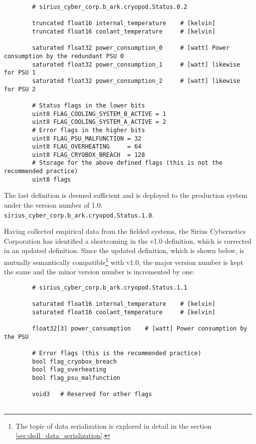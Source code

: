 \begin{remark}[breakable]
    \begin{verbatim}
        # sirius_cyber_corp.b_ark.cryopod.Status.0.2

        truncated float16 internal_temperature    # [kelvin]
        truncated float16 coolant_temperature     # [kelvin]

        saturated float32 power_consumption_0     # [watt] Power consumption by the redundant PSU 0
        saturated float32 power_consumption_1     # [watt] likewise for PSU 1
        saturated float32 power_consumption_2     # [watt] likewise for PSU 2

        # Status flags in the lower bits
        uint8 FLAG_COOLING_SYSTEM_B_ACTIVE = 1
        uint8 FLAG_COOLING_SYSTEM_A_ACTIVE = 2
        # Error flags in the higher bits
        uint8 FLAG_PSU_MALFUNCTION = 32
        uint8 FLAG_OVERHEATING     = 64
        uint8 FLAG_CRYOBOX_BREACH  = 128
        # Storage for the above defined flags (this is not the recommended practice)
        uint8 flags
    \end{verbatim}

    The last definition is deemed sufficient and is deployed to the production system
    under the version number of 1.0: \verb|sirius_cyber_corp.b_ark.cryopod.Status.1.0|.

    Having collected empirical data from the fielded systems, the Sirius Cybernetics Corporation has
    identified a shortcoming in the v1.0 definition, which is corrected in an updated definition.
    Since the updated definition, which is shown below, is mutually semantically
    compatible\footnote{The topic of data serialization is explored in detail in the section
    \ref{sec:dsdl_data_serialization}.}
    with v1.0, the major version number is kept the same and the minor version number is incremented by one:

    \begin{verbatim}
        # sirius_cyber_corp.b_ark.cryopod.Status.1.1

        saturated float16 internal_temperature    # [kelvin]
        saturated float16 coolant_temperature     # [kelvin]

        float32[3] power_consumption    # [watt] Power consumption by the PSU

        # Error flags (this is the recommended practice)
        bool flag_cryobox_breach
        bool flag_overheating
        bool flag_psu_malfunction

        void3   # Reserved for other flags


\end{verbatim}
\end{remark}
